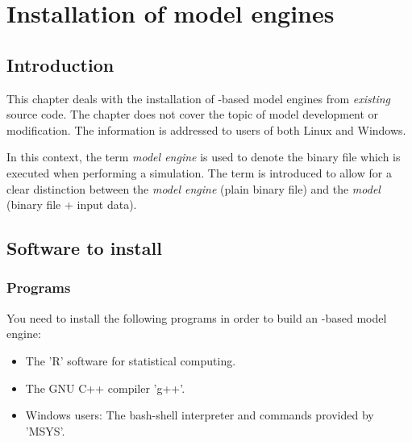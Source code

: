 
\chapter{Installation of model engines} \label{chap:install}
\renewcommand{\tabdir}{chapters/install/install/tab}
\renewcommand{\figdir}{chapters/install/install/fig}

\section{Introduction} \label{sec:install:intro}

This chapter deals with the installation of -based model engines from \emph{existing} source code. The chapter does not cover the topic of model development or modification. The information is addressed to users of both Linux and Windows.

In this context, the term \emph{model engine} is used to denote the binary file which is executed when performing a simulation. The term is introduced to allow for a clear distinction between the \emph{model engine} (plain binary file) and the \emph{model} (binary file + input data). 


\section{Software to install} \label{sec:install:software}


\subsection{Programs}

You need to install the following programs in order to build an -based model engine:

\begin{itemize}
  \item The 'R' software for statistical computing.
  \item The GNU C++ compiler 'g++'.
  \item Windows users: The bash-shell interpreter and commands provided by 'MSYS'.
\end{itemize}

